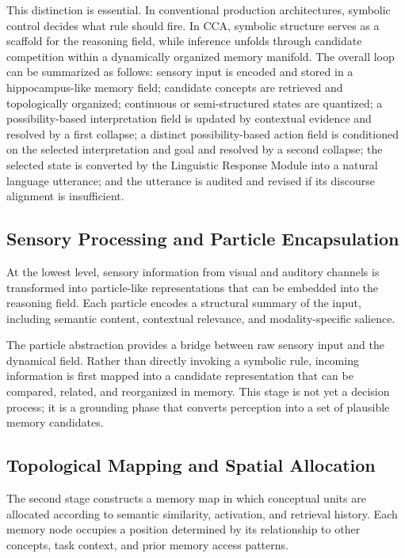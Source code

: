 \documentclass[10pt,journal,compsoc]{IEEEtran}
\begin{document}
This distinction is essential. In conventional production architectures, symbolic control decides what rule should fire. In CCA, symbolic structure serves as a scaffold for the reasoning field, while inference unfolds through candidate competition within a dynamically organized memory manifold. The overall loop can be summarized as follows: sensory input is encoded and stored in a hippocampus-like memory field; candidate concepts are retrieved and topologically organized; continuous or semi-structured states are quantized; a possibility-based interpretation field is updated by contextual evidence and resolved by a first collapse; a distinct possibility-based action field is conditioned on the selected interpretation and goal and resolved by a second collapse; the selected state is converted by the Linguistic Response Module into a natural language utterance; and the utterance is audited and revised if its discourse alignment is insufficient.

\subsection{Sensory Processing and Particle Encapsulation}

At the lowest level, sensory information from visual and auditory channels is transformed into particle-like representations that can be embedded into the reasoning field. Each particle encodes a structural summary of the input, including semantic content, contextual relevance, and modality-specific salience.

The particle abstraction provides a bridge between raw sensory input and the dynamical field. Rather than directly invoking a symbolic rule, incoming information is first mapped into a candidate representation that can be compared, related, and reorganized in memory. This stage is not yet a decision process; it is a grounding phase that converts perception into a set of plausible memory candidates.

\subsection{Topological Mapping and Spatial Allocation}

The second stage constructs a memory map in which conceptual units are allocated according to semantic similarity, activation, and retrieval history. Each memory node occupies a position determined by its relationship to other concepts, task context, and prior memory access patterns.
\end{document}
